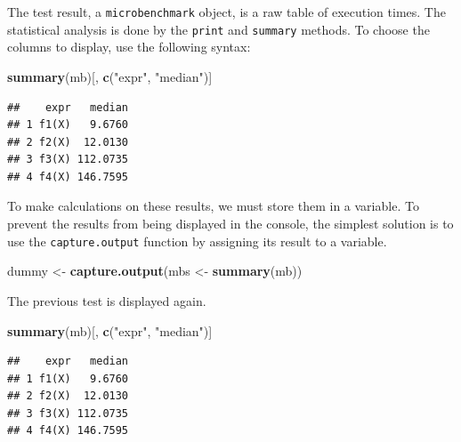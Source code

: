\documentclass[
  12pt,
  american,
  a4paper,
  extrafontsizes,onecolumn,openright
  ]{memoir}
\newenvironment{Shaded}{\begin{snugshade}}{\end{snugshade}}
\newcommand{\FunctionTok}[1]{\textcolor[rgb]{0.13,0.29,0.53}{\textbf{#1}}}
\newcommand{\NormalTok}[1]{#1}
\newcommand{\OtherTok}[1]{\textcolor[rgb]{0.56,0.35,0.01}{#1}}
\newcommand{\StringTok}[1]{\textcolor[rgb]{0.31,0.60,0.02}{#1}}
\begin{document}
The test result, a \texttt{microbenchmark} object, is a raw table of execution times.
The statistical analysis is done by the \texttt{print} and \texttt{summary} methods.
To choose the columns to display, use the following syntax:

\scriptsize

\begin{Shaded}
\begin{Highlighting}[]
\FunctionTok{summary}\NormalTok{(mb)[, }\FunctionTok{c}\NormalTok{(}\StringTok{"expr"}\NormalTok{, }\StringTok{"median"}\NormalTok{)]}
\end{Highlighting}
\end{Shaded}

\begin{verbatim}
##    expr   median
## 1 f1(X)   9.6760
## 2 f2(X)  12.0130
## 3 f3(X) 112.0735
## 4 f4(X) 146.7595
\end{verbatim}

\normalsize

To make calculations on these results, we must store them in a variable.
To prevent the results from being displayed in the console, the simplest solution is to use the \texttt{capture.output} function by assigning its result to a variable.

\scriptsize

\begin{Shaded}
\begin{Highlighting}[]
\NormalTok{dummy }\OtherTok{\textless{}{-}} \FunctionTok{capture.output}\NormalTok{(mbs }\OtherTok{\textless{}{-}} \FunctionTok{summary}\NormalTok{(mb))}
\end{Highlighting}
\end{Shaded}

\normalsize

The previous test is displayed again.

\scriptsize

\begin{Shaded}
\begin{Highlighting}[]
\FunctionTok{summary}\NormalTok{(mb)[, }\FunctionTok{c}\NormalTok{(}\StringTok{"expr"}\NormalTok{, }\StringTok{"median"}\NormalTok{)]}
\end{Highlighting}
\end{Shaded}

\begin{verbatim}
##    expr   median
## 1 f1(X)   9.6760
## 2 f2(X)  12.0130
## 3 f3(X) 112.0735
## 4 f4(X) 146.7595
\end{verbatim}
\end{document}
